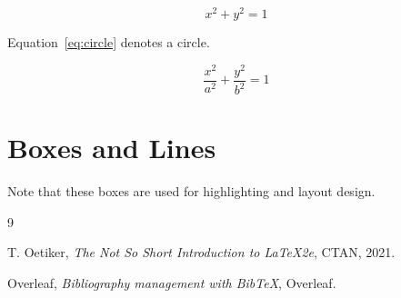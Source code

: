 \documentclass[12pt,a4paper]{article}
\begin{document}
\renewcommand{\thesection}{\Alph{section}}

\begin{equation}
x^2+y^2=1
\label{eq:circle}
\end{equation}

Equation~\ref{eq:circle} denotes a circle.

\begin{equation}
\frac{x^2}{a^2}+\frac{y^2}{b^2}=1
\label{eq:ellipse}
\end{equation}

\section{Boxes and Lines}

\newsavebox{\messagebox}


\usebox{\messagebox}\par\medskip

\usebox{\messagebox}\par\medskip

\usebox{\messagebox}\par\medskip


\medskip

Note that these boxes are used for highlighting and layout design.

\printindex

\begin{thebibliography}{9}

T. Oetiker, \textit{The Not So Short Introduction to \LaTeX2e},
CTAN, 2021.

Overleaf, \textit{Bibliography management with BibTeX}, Overleaf.

\end{thebibliography}
\end{document}
